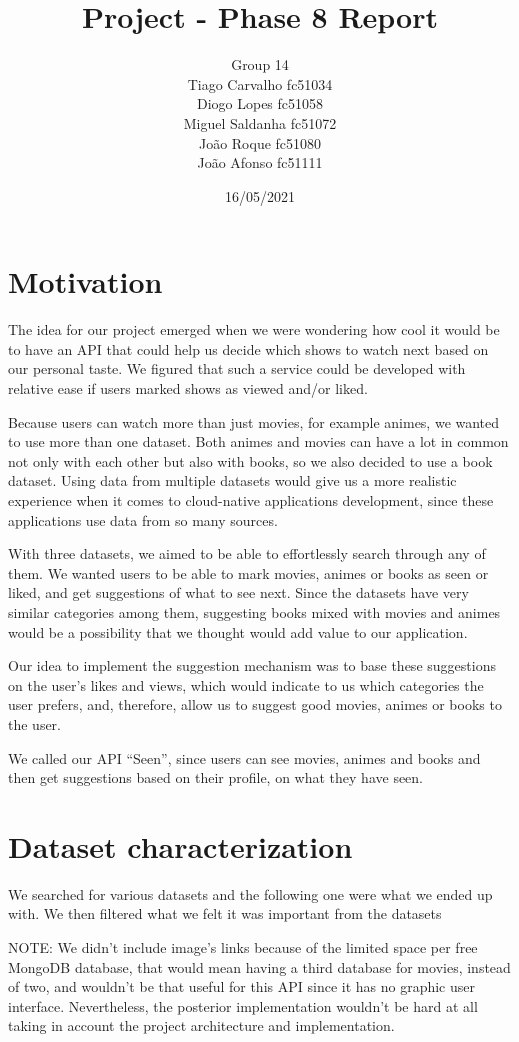 \documentclass[oneside]{article}
\title{Project - Phase 8 Report}
\author{Group 14 \\
Tiago Carvalho fc51034 \\
Diogo Lopes fc51058 \\
Miguel Saldanha fc51072 \\
João Roque fc51080 \\
João Afonso fc51111 \\
}
\date{16/05/2021}
\newcommand*\fpar{\hspace{1ex}}
\begin{document}
\maketitle

\section{Motivation}
\label{sec:motivation}
\fpar The idea for our project emerged when we were wondering how cool it would be to have an API that could help us decide which shows to watch next based on our personal taste. We figured that such a service could be developed with relative ease if users marked shows as viewed and/or liked.
\par Because users can watch more than just movies, for example animes, we wanted to use more than one dataset. Both animes and movies can have a lot in common not only with each other but also with books, so we also decided to use a book dataset. Using data from multiple datasets would give us a more realistic experience when it comes to cloud-native applications development, since these applications use data from so many sources.
\par With three datasets, we aimed to be able to effortlessly search through any of them. We wanted users to be able to mark movies, animes or books as seen or liked, and get suggestions of what to see next. Since the datasets have very similar categories among them, suggesting books mixed with movies and animes would be a possibility that we thought would add value to our application.
\par Our idea to implement the suggestion mechanism was to base these suggestions on the user's likes and views, which would indicate to us which categories the user prefers, and, therefore, allow us to suggest good movies, animes or books to the user.
\par We called our API “Seen”, since users can see movies, animes and books and then get suggestions based on their profile, on what they have seen.

\clearpage
\section{Dataset characterization}
\label{sec:dataset}
\fpar We searched for various datasets and the following one were what we ended up with. We then filtered what we felt it was important from the datasets
\par NOTE: We didn't include image's links because of the limited space per free MongoDB database, that would mean having a third database for movies, instead of two, and wouldn't be that useful for this API since it has no graphic user interface. Nevertheless, the posterior implementation wouldn't be hard at all taking in account the project architecture and implementation.
\end{document}
